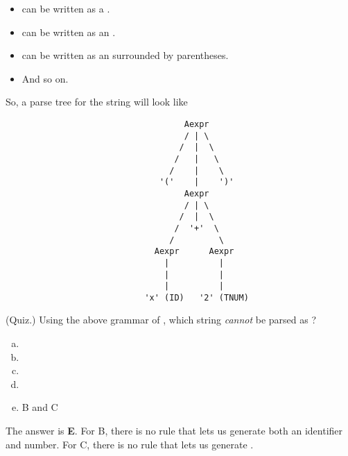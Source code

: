 \documentclass[letterpaper]{article}
\begin{document}
\begin{itemize}
    \begin{itemize}
        \item {} can be written as a .
        \item {} can be written as an .
        \item {} can be written as an  surrounded by parentheses.
        \item And so on. 
    \end{itemize}
    So, a parse tree for the string  will look like 
    \begin{verbatim}
                                    Aexpr 
                                    / | \ 
                                   /  |  \ 
                                  /   |   \ 
                                 /    |    \ 
                               '('    |    ')'
                                    Aexpr
                                    / | \ 
                                   /  |  \ 
                                  /  '+'  \ 
                                 /         \
                              Aexpr      Aexpr 
                                |          |
                                |          |
                                |          |
                            'x' (ID)   '2' (TNUM)\end{verbatim}
    \begin{mdframed}[]
        (Quiz.) Using the above grammar of , which string \emph{cannot} be parsed as ?
    
        \begin{enumerate}[(a)]
            \item \code{x}
            \item \code{x 5}
            \item \code{(x +) 5}
            \item \code{x + 5 + 1}
            \item B and C 
        \end{enumerate}
    
        \begin{mdframed}[]
            The answer is \textbf{E}. For B, there is no rule that lets us generate both an identifier and number. For C, there is no rule that lets us generate .
        \end{mdframed}
    \end{mdframed}


\end{itemize}
\end{document}
